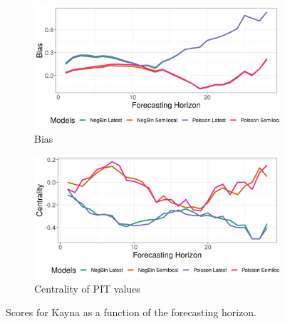 \begin{figure}[H]
\begin{subfigure}{0.5\textwidth}
  \centering
  \includegraphics[width=\linewidth]{../output/Kayna_bias.png}  
  \caption{Bias}
  \label{fig:Kayna_scores_3}
\end{subfigure}
\begin{subfigure}{0.5\textwidth}
  \centering
  \includegraphics[width=\linewidth]{../output/Kayna_centrality.png}  
  \caption{Centrality of PIT values}
  \label{fig:Kayna_scores_4}
\end{subfigure}
  \caption{Scores for Kayna as a function of the forecasting horizon.}

  \label{fig:nat_scores}
\end{figure}
